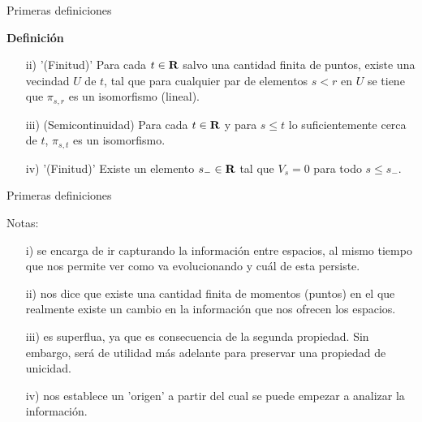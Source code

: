 \documentclass{beamer}
\def\R\re
\def \R{{\bf R}}
\def \re{{\mathbb R}}
\begin{document}
\begin{frame}{Primeras definiciones}

\begin{block}{\textbf{Definición}}

\begin{itemize}
    \item[ii)] '(Finitud)' Para cada $t\in\R$ salvo una cantidad finita de puntos, existe una vecindad $U$ de $t$, tal que para cualquier par de elementos $s<r$ en $U$ se tiene que $\pi_{s,r}$ es un isomorfismo (lineal).
\pause
    \item[iii)]  (Semicontinuidad) Para cada $t\in \R$ y para $s\leq t$ lo suficientemente cerca de $t$, $\pi_{s,t}$ es un isomorfismo.
\pause
    \item[iv)] '(Finitud)' Existe un elemento $s_-\in\R$ tal que $V_s=0$ para todo $s\leq s_-$.
    
\end{itemize}

\end{block}

\end{frame}

\begin{frame}{Primeras definiciones}

 \begin{block}{Notas:}
 \begin{itemize}
\item[i)] se encarga de ir capturando la información entre espacios, al mismo tiempo que nos permite ver como va evolucionando y cuál de esta persiste. 
\pause
\vfill

 \item[ii)] nos dice que existe una cantidad finita de momentos (puntos) en el que realmente existe un cambio en la información que nos ofrecen los espacios.
 \vfill

 \pause
 
 \item[iii)] es superflua, ya que es consecuencia de la segunda propiedad. Sin embargo, será de utilidad más adelante para preservar una propiedad de unicidad.
\vfill

\pause

\item[iv)] nos establece un 'origen' a partir del cual se puede empezar a analizar la información.
 
\end{itemize}
\end{block}
\end{frame}
\end{document}
